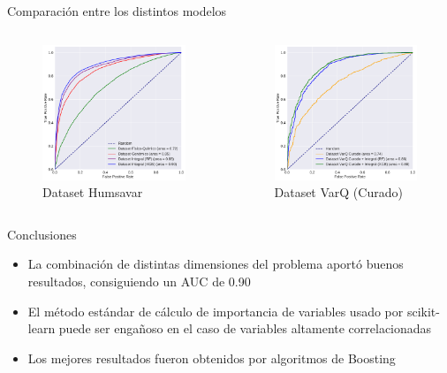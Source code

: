 \documentclass[
  spanish,
  ignorenonframetext,
]{beamer}
\providecommand{\tightlist}{%
  \setlength{\itemsep}{0pt}\setlength{\parskip}{0pt}}
\begin{document}
\begin{frame}{Comparación entre los distintos modelos}
\protect\hypertarget{comparaciuxf3n-entre-los-distintos-modelos}{}

\begin{columns}[T]
\begin{column}{0.48\textwidth}
\begin{figure}
\centering
\includegraphics[width=2.08333in,height=\textheight]{curvas_auc_humsavar.pdf}
\caption{Dataset Humsavar}
\end{figure}
\end{column}

\begin{column}{0.48\textwidth}
\begin{figure}
\centering
\includegraphics[width=2.08333in,height=\textheight]{curvas_auc_varq.pdf}
\caption{Dataset VarQ (Curado)}
\end{figure}
\end{column}
\end{columns}

\end{frame}

\begin{frame}{Conclusiones}
\protect\hypertarget{conclusiones}{}

\begin{itemize}
\tightlist
\item
  La combinación de distintas dimensiones del problema aportó buenos
  resultados, consiguiendo un AUC de 0.90
\item
  El método estándar de cálculo de importancia de variables usado por
  scikit-learn puede ser engañoso en el caso de variables altamente
  correlacionadas
\item
  Los mejores resultados fueron obtenidos por algoritmos de Boosting
\end{itemize}

\end{frame}
\end{document}
